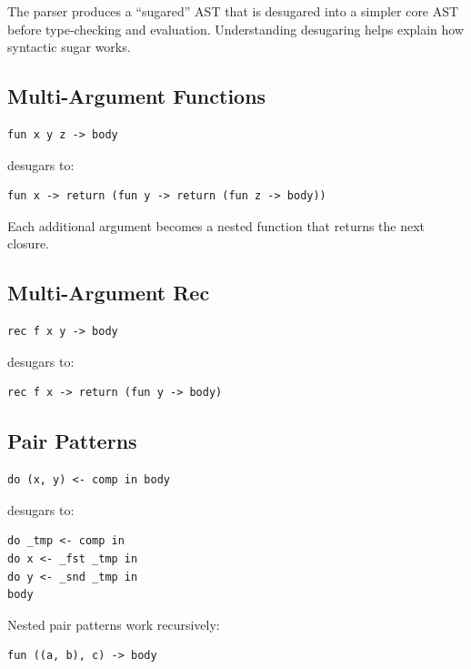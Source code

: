 \documentclass[11pt,a4paper]{article}
\begin{document}
The parser produces a ``sugared'' AST that is desugared into a simpler core AST
before type-checking and evaluation.  Understanding desugaring helps explain
how syntactic sugar works.

\subsection{Multi-Argument Functions}

\begin{lstlisting}
fun x y z -> body
\end{lstlisting}

desugars to:

\begin{lstlisting}
fun x -> return (fun y -> return (fun z -> body))
\end{lstlisting}

Each additional argument becomes a nested function that returns the next
closure.

\subsection{Multi-Argument Rec}

\begin{lstlisting}
rec f x y -> body
\end{lstlisting}

desugars to:

\begin{lstlisting}
rec f x -> return (fun y -> body)
\end{lstlisting}

\subsection{Pair Patterns}

\begin{lstlisting}
do (x, y) <- comp in body
\end{lstlisting}

desugars to:

\begin{lstlisting}
do _tmp <- comp in
do x <- _fst _tmp in
do y <- _snd _tmp in
body
\end{lstlisting}

Nested pair patterns work recursively:

\begin{lstlisting}
fun ((a, b), c) -> body
\end{lstlisting}
\end{document}
